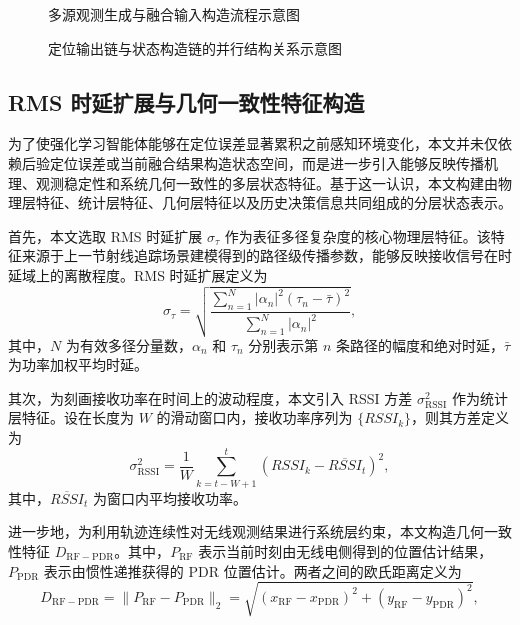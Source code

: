 \begin{figure}[htbp]
    \centering
    \vspace{4.2cm}
    \caption{多源观测生成与融合输入构造流程示意图}
    \label{fig:multi_source_observation_flow}
\end{figure}

\begin{figure}[htbp]
    \centering
    \vspace{4.2cm}
    \caption{定位输出链与状态构造链的并行结构关系示意图}
    \label{fig:multi_source_parallel_chain}
\end{figure}

\subsection{RMS 时延扩展与几何一致性特征构造}
\label{subsec:3_2_3}

为了使强化学习智能体能够在定位误差显著累积之前感知环境变化，本文并未仅依赖后验定位误差或当前融合结果构造状态空间，而是进一步引入能够反映传播机理、观测稳定性和系统几何一致性的多层状态特征。基于这一认识，本文构建由物理层特征、统计层特征、几何层特征以及历史决策信息共同组成的分层状态表示。

首先，本文选取 RMS 时延扩展 \(\sigma_\tau\) 作为表征多径复杂度的核心物理层特征。该特征来源于上一节射线追踪场景建模得到的路径级传播参数，能够反映接收信号在时延域上的离散程度。RMS 时延扩展定义为
\begin{equation}
\sigma_\tau=
\sqrt{
\frac{\sum_{n=1}^{N} |\alpha_n|^2 (\tau_n-\bar{\tau})^2}
{\sum_{n=1}^{N} |\alpha_n|^2}
},
\label{eq:3_8_rms_delay}
\end{equation}
其中，\(N\) 为有效多径分量数，\(\alpha_n\) 和 \(\tau_n\) 分别表示第 \(n\) 条路径的幅度和绝对时延，\(\bar{\tau}\) 为功率加权平均时延。

其次，为刻画接收功率在时间上的波动程度，本文引入 RSSI 方差 \(\sigma^2_{\mathrm{RSSI}}\) 作为统计层特征。设在长度为 \(W\) 的滑动窗口内，接收功率序列为 \(\{RSSI_k\}\)，则其方差定义为
\begin{equation}
\sigma^2_{\mathrm{RSSI}}
=
\frac{1}{W}
\sum_{k=t-W+1}^{t}
\left(
RSSI_k-\overline{RSSI}_t
\right)^2,
\label{eq:3_9_rssi_var}
\end{equation}
其中，\(\overline{RSSI}_t\) 为窗口内平均接收功率。

进一步地，为利用轨迹连续性对无线观测结果进行系统层约束，本文构造几何一致性特征 \(D_{\mathrm{RF-PDR}}\)。其中，\(P_{\mathrm{RF}}\) 表示当前时刻由无线电侧得到的位置估计结果，\(P_{\mathrm{PDR}}\) 表示由惯性递推获得的 PDR 位置估计。两者之间的欧氏距离定义为
\begin{equation}
D_{\mathrm{RF-PDR}}
=
\|P_{\mathrm{RF}}-P_{\mathrm{PDR}}\|_2
=
\sqrt{
(x_{\mathrm{RF}}-x_{\mathrm{PDR}})^2
+
(y_{\mathrm{RF}}-y_{\mathrm{PDR}})^2
},
\label{eq:3_10_geo_consistency}
\end{equation}

